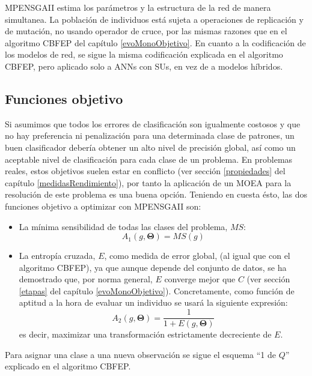 MPENSGAII estima los parámetros y la estructura de la red de manera simultanea. La
población de individuos está sujeta a operaciones de replicación y de mutación, no
usando operador de cruce, por las mismas razones que en el algoritmo CBFEP del capítulo
\ref{evoMonoObjetivo}. En cuanto a la codificación de los modelos de red, se sigue la
misma codificación explicada en el algoritmo CBFEP, pero aplicado solo a ANNs con SUs, en
vez de a modelos híbridos.

\subsection{Funciones objetivo}\label{funcionesObjetivo}
\noindent Si asumimos que todos los errores de clasificación son igualmente costosos y que
no hay preferencia ni penalización para una determinada clase de patrones, un buen
clasificador debería obtener un alto nivel de precisión global, así como un
aceptable nivel de clasificación para cada clase de un problema. En
problemas reales, estos objetivos suelen estar en conflicto (ver sección \ref{propiedades}
del capítulo \ref{medidasRendimiento}), por tanto la aplicación de un MOEA para la
resolución de este problema es una buena opción. Teniendo en cuesta ésto, las dos
funciones objetivo a optimizar con MPENSGAII son:
\begin{itemize}
\item La mínima sensibilidad de todas las clases del problema, $MS$:
\begin{displaymath}
A_{1}\left( g,\mathbf{\Theta}\right) = MS(g)
\end{displaymath}
\item La entropía cruzada, $E$, como medida de error global, (al igual que con el algoritmo
CBFEP), ya que aunque depende del conjunto de datos, se ha demostrado que, por norma
general, $E$ converge mejor que $C$ (ver sección \ref{etapas} del capítulo
\ref{evoMonoObjetivo}). Concretamente, como función de aptitud a la hora de
evaluar un individuo se usará la siguiente expresión:
\begin{displaymath}
\label{aptitudNNEP}
A_{2}\left( g,\mathbf{\Theta}\right) =\frac{1}{1+E\left( g,\mathbf{\Theta}\right)}
\end{displaymath}
es decir, maximizar una transformación estrictamente decreciente de $E$.
\end{itemize}

Para asignar una clase a una nueva observación se sigue el esquema ``1 de $Q$''
explicado en el algoritmo CBFEP.

